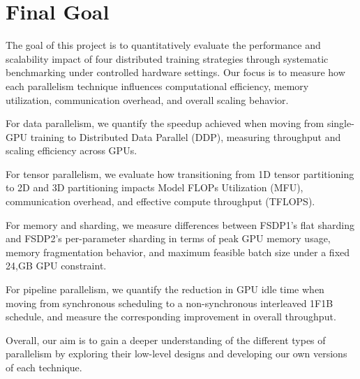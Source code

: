 \documentclass[conference]{IEEEtran}
\begin{document}
\section{Final Goal}

The goal of this project is to quantitatively evaluate the performance and scalability impact of four distributed training strategies through systematic benchmarking under controlled hardware settings. Our focus is to measure how each parallelism technique influences computational efficiency, memory utilization, communication overhead, and overall scaling behavior.

For data parallelism, we quantify the speedup achieved when moving from single-GPU training to Distributed Data Parallel (DDP), measuring throughput and scaling efficiency across GPUs.

For tensor parallelism, we evaluate how transitioning from 1D tensor partitioning to 2D and 3D partitioning impacts Model FLOPs Utilization (MFU), communication overhead, and effective compute throughput (TFLOPS).

For memory and sharding, we measure differences between FSDP1’s flat sharding and FSDP2’s per-parameter sharding in terms of peak GPU memory usage, memory fragmentation behavior, and maximum feasible batch size under a fixed 24,GB GPU constraint.

For pipeline parallelism, we quantify the reduction in GPU idle time when moving from synchronous scheduling to a non-synchronous interleaved 1F1B schedule, and measure the corresponding improvement in overall throughput.

Overall, our aim is to gain a deeper understanding of the different types of parallelism by exploring their low-level designs and developing our own versions of each technique.

\newpage





\end{document}
